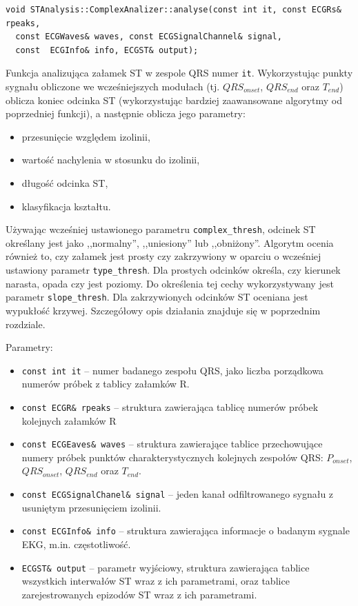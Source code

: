 \documentclass[a4paper, 11pt]{article}
\begin{document}
\begin{lstlisting}
void STAnalysis::ComplexAnalizer::analyse(const int it, const ECGRs& rpeaks,
  const ECGWaves& waves, const ECGSignalChannel& signal,
  const  ECGInfo& info, ECGST& output);
\end{lstlisting}

Funkcja analizująca załamek ST w zespole QRS numer \verb|it|. Wykorzystując
punkty sygnału obliczone we wcześniejszych modułach (tj. $QRS_{onset}$,
$QRS_{end}$ oraz $T_{end}$) oblicza koniec odcinka ST (wykorzystując bardziej
zaawansowane algorytmy od poprzedniej funkcji), a następnie oblicza jego parametry:
\begin{itemize}
  \item przesunięcie względem izolinii,
  \item wartość nachylenia w stosunku do izolinii,
  \item długość odcinka ST,
  \item klasyfikacja kształtu.
\end{itemize}
Używając wcześniej ustawionego parametru \verb|complex_thresh|, odcinek ST
określany jest jako ,,normalny'', ,,uniesiony'' lub ,,obniżony''. Algorytm
ocenia również to, czy załamek jest prosty czy zakrzywiony w oparciu o
wcześniej ustawiony parametr \verb|type_thresh|. Dla prostych odcinków określa,
czy kierunek narasta, opada czy jest poziomy. Do określenia tej cechy
wykorzystywany jest parametr \verb|slope_thresh|. Dla zakrzywionych odcinków ST
oceniana jest wypukłość krzywej. Szczegółowy opis działania znajduje się w
poprzednim rozdziale.

Parametry:
\begin{itemize}
  \item \verb|const int it| -- numer badanego zespołu QRS, jako liczba
    porządkowa numerów próbek z tablicy załamków R.
  \item \verb|const ECGR& rpeaks| -- struktura zawierająca tablicę numerów
    próbek kolejnych załamków R
  \item \verb|const ECGEaves& waves| -- struktura zawierające tablice
    przechowujące numery próbek punktów charakterystycznych kolejnych zespołów
    QRS: $P_{onset}$, $QRS_{onset}$, $QRS_{end}$ oraz $T_{end}$.
  \item \verb|const ECGSignalChanel& signal| -- jeden kanał odfiltrowanego
    sygnału z usuniętym przesunięciem izolinii.
  \item \verb|const ECGInfo& info| -- struktura zawierająca informacje o badanym
    sygnale EKG, m.in. częstotliwość.
  \item \verb|ECGST& output| -- parametr wyjściowy, struktura zawierająca
    tablice wszystkich interwałów ST wraz z ich parametrami, oraz tablice
    zarejestrowanych epizodów ST wraz z ich parametrami.
\end{itemize}
\end{document}
